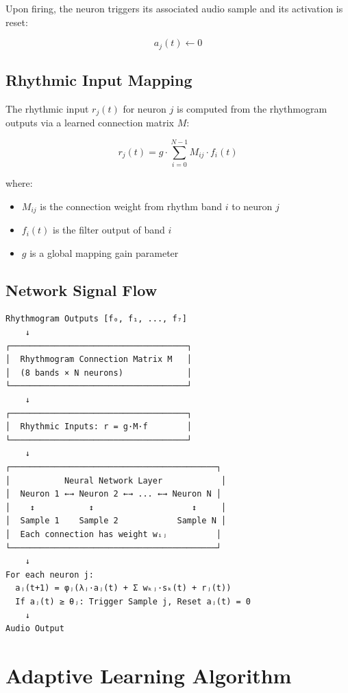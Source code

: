 \documentclass[11pt,a4paper]{article}
\begin{document}
Upon firing, the neuron triggers its associated audio sample and its activation is reset:

\begin{equation}
a_j(t) \leftarrow 0
\end{equation}

\subsection{Rhythmic Input Mapping}

The rhythmic input $r_j(t)$ for neuron $j$ is computed from the rhythmogram outputs via a learned connection matrix $M$:

\begin{equation}
r_j(t) = g \cdot \sum_{i=0}^{N-1} M_{ij} \cdot f_i(t)
\end{equation}

\noindent where:
\begin{itemize}
\item $M_{ij}$ is the connection weight from rhythm band $i$ to neuron $j$
\item $f_i(t)$ is the filter output of band $i$
\item $g$ is a global mapping gain parameter
\end{itemize}

\subsection{Network Signal Flow}

\begin{verbatim}
Rhythmogram Outputs [f₀, f₁, ..., f₇]
    ↓
┌────────────────────────────────────┐
│  Rhythmogram Connection Matrix M   │
│  (8 bands × N neurons)             │
└────────────────────────────────────┘
    ↓
┌────────────────────────────────────┐
│  Rhythmic Inputs: r = g·M·f        │
└────────────────────────────────────┘
    ↓
┌──────────────────────────────────────────┐
│           Neural Network Layer            │
│  Neuron 1 ←→ Neuron 2 ←→ ... ←→ Neuron N │
│    ↕           ↕                    ↕     │
│  Sample 1    Sample 2            Sample N │
│  Each connection has weight wᵢⱼ          │
└──────────────────────────────────────────┘
    ↓
For each neuron j:
  aⱼ(t+1) = φⱼ(λⱼ·aⱼ(t) + Σ wₖⱼ·sₖ(t) + rⱼ(t))
  If aⱼ(t) ≥ θⱼ: Trigger Sample j, Reset aⱼ(t) = 0
    ↓
Audio Output
\end{verbatim}

\section{Adaptive Learning Algorithm}
\end{document}
